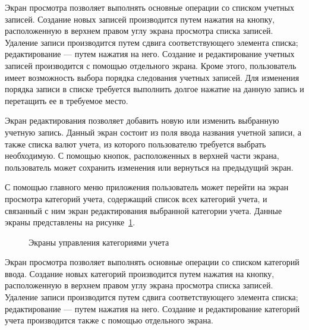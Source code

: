 Экран просмотра позволяет выполнять основные операции
со списком учетных записей.
Создание новых записей производится путем нажатия на кнопку,
расположенную в верхнем правом углу экрана просмотра списка записей.
Удаление записи производится путем сдвига соответствующего элемента списка;
редактирование --- путем нажатия на него.
Создание и редактирование учетных записей производится с помощью
отдельного экрана.
Кроме этого, пользователь имеет возможность выбора порядка следования
учетных записей. Для изменения порядка записи в списке требуется
выполнить долгое нажатие на данную запись и перетащить ее в требуемое место.

Экран редактирования позволяет добавить новую или изменить выбранную
учетную запись. Данный экран состоит из поля ввода названия учетной записи,
а также списка валют учета, из которого пользователю требуется выбрать необходимую.
С помощью кнопок, расположенных в верхней части экрана, пользователь
может сохранить изменения или вернуться на предыдущий экран.

С помощью главного меню приложения пользователь может перейти на
экран просмотра категорий учета, содержащий список всех категорий учета,
и связанный с ним экран редактирования выбранной категории учета.
Данные экраны представлены на рисунке~\ref{fig:implementation_ui_activity_category}.

\begin{figure}[h!]
  \centering
  \caption{Экраны управления категориями учета}
  \label{fig:implementation_ui_activity_category}
\end{figure}

Экран просмотра позволяет выполнять основные операции
со списком категорий ввода.
Создание новых категорий производится путем нажатия на кнопку,
расположенную в верхнем правом углу экрана просмотра списка записей.
Удаление записи производится путем сдвига соответствующего элемента списка;
редактирование --- путем нажатия на него.
Создание и редактирование категорий учета производится также
с помощью отдельного экрана.

